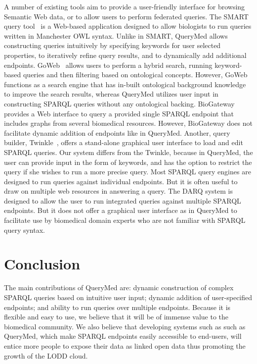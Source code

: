 \documentclass{acm_proc_article-sp}
\begin{document}
A number of existing tools aim to provide a user-friendly interface for browsing Semantic Web data, or to allow users to perform federated queries. The SMART query tool~\cite{Battista} is a Web-based application designed to allow biologists to run queries written in Manchester OWL syntax. Unlike in SMART, QueryMed allows constructing queries intuitively by specifying keywords for user selected properties, to iteratively refine query results, and to dynamically add additional endpoints. GoWeb~\cite{Dietze} allows users to perform a hybrid search, running keyword-based queries and then filtering based on ontological concepts. However, GoWeb functions as a search engine that has in-built ontological background knowledge to improve the search results, whereas QueryMed utilizes user input in constructing SPARQL queries without any ontological backing.  BioGateway~\cite{Antezana} provides a Web interface to query a provided single SPARQL endpoint that includes graphs from several biomedical resources. However, BioGateway does not facilitate dynamic addition of endpoints like in QueryMed. Another, query builder, Twinkle~\cite{Dodds}, offers a stand-alone graphical user interface to load and edit SPARQL queries. Our system differs from the Twinkle, because in QueryMed, the user can provide input in the form of keywords, and has the option to restrict the query if she wishes to run a more precise query. Most SPARQL query engines are designed to run queries against individual endpoints. But it is often useful to draw on multiple web resources in answering a query. The DARQ  system \cite{Quilitz} is designed to allow the user to run integrated queries against multiple SPARQL endpoints. But it does not offer a graphical user interface as in QueryMed to facilitate use by biomedical domain experts who are not familiar with SPARQL query syntax.

\section{Conclusion}
\label{conclusion}

The main contributions of QueryMed are: dynamic construction of complex SPARQL queries based on intuitive user input; dynamic addition of user-specified endpoints; and ability to run queries over multiple endpoints. Because it is flexible and easy to use, we believe that it will be of immense value to the biomedical community.  We also believe that developing systems such as such as QueryMed, which make SPARQL endpoints  easily accessible to end-users, will entice more people to expose their data as linked open data thus promoting the growth of the LODD cloud.



\end{document}
